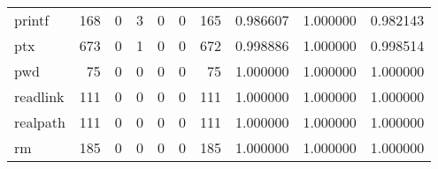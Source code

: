 \begin{tabular}{lrrrrrrrrr}
printf    &                                   168 &                                                  0 &                                                  3 &                                                  0 &                                                  0 &                                                165 &                                           0.986607 &                               1.000000 &                             0.982143 \\
ptx       &                                   673 &                                                  0 &                                                  1 &                                                  0 &                                                  0 &                                                672 &                                           0.998886 &                               1.000000 &                             0.998514 \\
pwd       &                                    75 &                                                  0 &                                                  0 &                                                  0 &                                                  0 &                                                 75 &                                           1.000000 &                               1.000000 &                             1.000000 \\
readlink  &                                   111 &                                                  0 &                                                  0 &                                                  0 &                                                  0 &                                                111 &                                           1.000000 &                               1.000000 &                             1.000000 \\
realpath  &                                   111 &                                                  0 &                                                  0 &                                                  0 &                                                  0 &                                                111 &                                           1.000000 &                               1.000000 &                             1.000000 \\
rm        &                                   185 &                                                  0 &                                                  0 &                                                  0 &                                                  0 &                                                185 &                                           1.000000 &                               1.000000 &                             1.000000 \\

\end{tabular}
